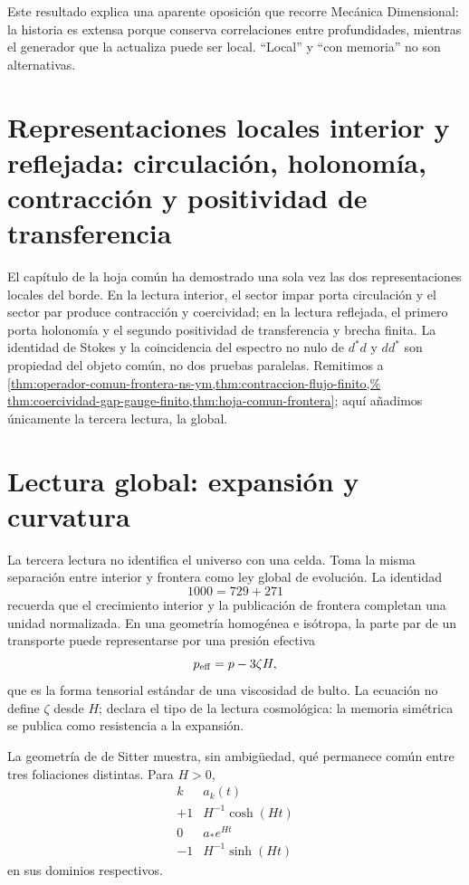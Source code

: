 Este resultado explica una aparente oposición que recorre Mecánica
Dimensional: la historia es extensa porque conserva correlaciones entre
profundidades, mientras el generador que la actualiza puede ser local.
``Local'' y ``con memoria'' no son alternativas.

\section{Representaciones locales interior y reflejada: circulación, holonomía, contracción y positividad de transferencia}

El capítulo de la hoja común ha demostrado una sola vez las dos
representaciones locales del borde. En la lectura interior, el sector impar
porta circulación y el sector par produce contracción y coercividad; en la
lectura reflejada, el primero porta holonomía y el segundo positividad de
transferencia y brecha finita. La identidad de Stokes y la coincidencia del
espectro no nulo de \(d^\ast d\) y \(dd^\ast\) son propiedad del objeto
común, no dos pruebas paralelas. Remitimos a
\cref{thm:operador-comun-frontera-ns-ym,thm:contraccion-flujo-finito,%
thm:coercividad-gap-gauge-finito,thm:hoja-comun-frontera}; aquí añadimos
únicamente la tercera lectura, la global.

\section{Lectura global: expansión y curvatura}

La tercera lectura no identifica el universo con una celda.  Toma la misma
separación entre interior y frontera como ley global de evolución.  La
identidad
\[
 1000=729+271
\]
recuerda que el crecimiento interior y la publicación de frontera completan
una unidad normalizada.  En una geometría homogénea e isótropa, la parte par
de un transporte puede representarse por una presión efectiva
\[
 p_{\rm eff}=p-3\zeta H,
\]
que es la forma tensorial estándar de una viscosidad de bulto.  La ecuación
no define \(\zeta\) desde \(H\); declara el tipo de la lectura cosmológica:
la memoria simétrica se publica como resistencia a la expansión.

La geometría de de Sitter muestra, sin ambigüedad, qué permanece común entre
tres foliaciones distintas.  Para \(H>0\),
\[
\begin{array}{c|c}
k&a_k(t)\\ \hline
+1&H^{-1}\cosh(Ht)\\
0&a_\ast e^{Ht}\\
-1&H^{-1}\sinh(Ht)
\end{array}
\]
en sus dominios respectivos.


